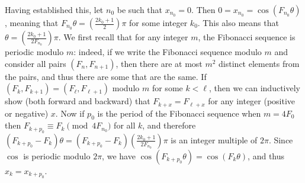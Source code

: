 \documentclass[11pt,a4paper]{article}
\newcommand{\<}{\langle}
\renewcommand{\>}{\rangle}
\begin{document}
\begin{enumerate}
	Having established this, let $n_0$ be such that $x_{n_0}=0$. Then $0=x_{n_0}=\cos(F_{n_0}\theta)$, meaning that $F_{n_0}\theta=(\frac{2k_0+1}{2})\pi$ for some integer $k_0$. 
	This also means that $\theta = (\frac{2k_0+1}{2F_{n_0}})\pi$. We first recall that for any integer $m$, the Fibonacci sequence is periodic modulo $m$: indeed, if we write the Fibonacci sequence modulo $m$ and consider all pairs $(F_n, F_{n+1})$, then there are at most $m^2$ distinct elements from the pairs, and thus there are some that are the same. If $(F_{k}, F_{k+1})=(F_{\ell}, F_{\ell+1})$ modulo $m$ for some $k<\ell$, then we can inductively show (both forward and backward) that $F_{k+x}=F_{\ell+x}$ for any integer (positive or negative) $x$. Now if $p_0$ is the period of the Fibonacci sequence when $m=4F_0$ then $F_{k+p_0}\equiv F_k\pmod{4F_{n_0}}$ for all $k$, and therefore $(F_{k+p_0}-F_k)\theta = (F_{k+p_0}-F_k)(\frac{2k_0+1}{2F_{n_0}})\pi$ is an integer multiple of $2\pi$. Since $\cos$ is periodic modulo $2\pi$, we have $\cos (F_{k+p_0}\theta) = \cos(F_k\theta)$, and thus $x_k=x_{k+p_0}$. 
	
\end{enumerate}
\end{document}
